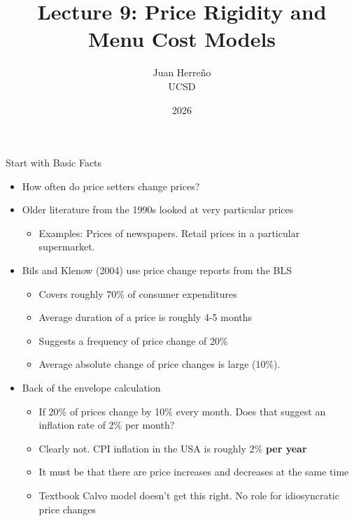 \documentclass[11pt,aspectratio=169,xcolor={dvipsnames},hyperref={pdftex,pdfpagemode=UseNone,hidelinks,pdfdisplaydoctitle=true},usepdftitle=false]{beamer}
\title{Lecture 9: Price Rigidity and Menu Cost Models}
\author{Juan Herre\~{n}o\\UCSD}
\date{2026}
\begin{document}
\maketitle


\begin{frame}{Start with Basic Facts}
\begin{itemize}
\item How often do price setters change prices?
\item Older literature from the 1990s looked at very particular prices
\begin{itemize}
\item Examples: Prices of newspapers. Retail prices in a particular supermarket.
\end{itemize}
\item Bils and Klenow (2004) use price change reports from the BLS
\begin{itemize}
\item Covers roughly 70\% of consumer expenditures
\item  Average duration of a price is roughly 4-5 months
\item Suggests a frequency of price change of 20\%
\item Average absolute change of price changes is large (10\%).
\end{itemize}
\item Back of the envelope calculation
\begin{itemize}
\item If 20\% of prices change by 10\% every month. Does that suggest an inflation rate of 2\% per month?
\item Clearly not. CPI inflation in the USA is roughly 2\% \textbf{per year}
\item It must be that there are price increases and decreases at the same time
\item Textbook Calvo model doesn't get this right. No role for idiosyncratic price changes
\end{itemize}
\end{itemize}
\end{frame}
\end{document}
